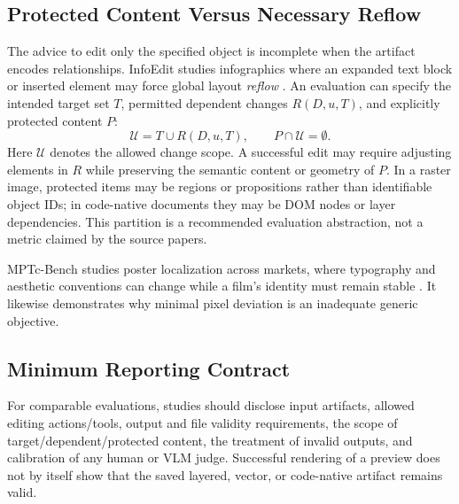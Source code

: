 \subsection{Protected Content Versus Necessary Reflow}
The advice to edit only the specified object is incomplete when the artifact encodes relationships. InfoEdit studies infographics where an expanded text block or inserted element may force global layout \emph{reflow} \citep{yang2026infoedit}. An evaluation can specify the intended target set $T$, permitted dependent changes $R(D,u,T)$, and explicitly protected content $P$:
\begin{equation}
\mathcal{U}=T\cup R(D,u,T),\qquad P\cap\mathcal{U}=\emptyset.
\label{eq:reflow}
\end{equation}
Here $\mathcal{U}$ denotes the allowed change scope. A successful edit may require adjusting elements in $R$ while preserving the semantic content or geometry of $P$. In a raster image, protected items may be regions or propositions rather than identifiable object IDs; in code-native documents they may be DOM nodes or layer dependencies. This partition is a recommended evaluation abstraction, not a metric claimed by the source papers.

MPTc-Bench studies poster localization across markets, where typography and aesthetic conventions can change while a film's identity must remain stable \citep{lin2026mptc}. It likewise demonstrates why minimal pixel deviation is an inadequate generic objective.

\subsection{Minimum Reporting Contract}
For comparable evaluations, studies should disclose input artifacts, allowed editing actions/tools, output and file validity requirements, the scope of target/dependent/protected content, the treatment of invalid outputs, and calibration of any human or VLM judge. Successful rendering of a preview does not by itself show that the saved layered, vector, or code-native artifact remains valid.
